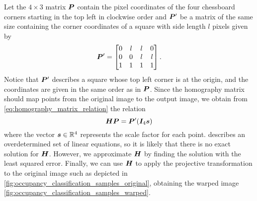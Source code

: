 \documentclass[../main.tex]{subfiles}
\begin{document}
Let the $4 \times 3$ matrix ${\bm{P}}$ contain the pixel coordinates of the four chessboard corners starting in the top left in clockwise order and ${\bm{P}}'$ be a matrix of the same size containing the corner coordinates of a square with side length $l$ pixels given by
\begin{equation*}
    {\bm{P}}' = \begin{bmatrix}
        0 & l & l & 0 \\
        0 & 0 & l & l \\
        1 & 1 & 1 & 1
    \end{bmatrix}.
\end{equation*}
Notice that ${\bm{P}}'$ describes a square whose top left corner is at the origin, and the coordinates are given in the same order as in ${\bm{P}}$.
Since the homography matrix should map points from the original image to the output image, we obtain from \cref{eq:homography_matrix_relation} the relation 
\begin{equation}
    \label{eq:homography_matrix_relation_corners}
    {\bm{H}} {\bm{P}} = {\bm{P}}' ({\bm{I}}_4 {\bm{s}})
\end{equation}
where the vector ${\bm{s}} \in \mathbb{R}^4$ represents the scale factor for each point.
 describes an overdetermined set of linear equations, so it is likely that there is no exact solution for ${\bm{H}}$. 
However, we approximate ${\bm{H}}$ by finding the solution with the least squared error.
Finally, we can use ${\bm{H}}$ to apply the projective transformation to the original image such as depicted in \cref{fig:occupancy_classification_samples_original}, obtaining the warped image \cref{fig:occupancy_classification_samples_warped}.
\end{document}

